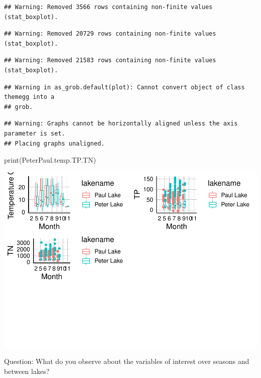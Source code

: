 \documentclass[
]{article}
\newenvironment{Shaded}{\begin{snugshade}}{\end{snugshade}}
\newcommand{\FunctionTok}[1]{\textcolor[rgb]{0.00,0.00,0.00}{#1}}
\newcommand{\NormalTok}[1]{#1}
\begin{document}
\begin{verbatim}
## Warning: Removed 3566 rows containing non-finite values (stat_boxplot).
\end{verbatim}

\begin{verbatim}
## Warning: Removed 20729 rows containing non-finite values (stat_boxplot).
\end{verbatim}

\begin{verbatim}
## Warning: Removed 21583 rows containing non-finite values (stat_boxplot).
\end{verbatim}

\begin{verbatim}
## Warning in as_grob.default(plot): Cannot convert object of class themegg into a
## grob.
\end{verbatim}

\begin{verbatim}
## Warning: Graphs cannot be horizontally aligned unless the axis parameter is set.
## Placing graphs unaligned.
\end{verbatim}

\begin{Shaded}
\begin{Highlighting}[]
\FunctionTok{print}\NormalTok{(PeterPaul.temp.TP.TN)}
\end{Highlighting}
\end{Shaded}

\includegraphics{A05_DataVisualization_files/figure-latex/unnamed-chunk-4-4.pdf}

Question: What do you observe about the variables of interest over
seasons and between lakes?
\end{document}
